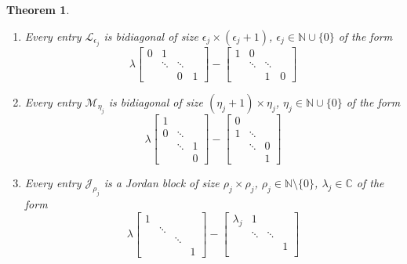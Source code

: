 \documentclass[]{book}
\providecommand{\tightlist}{%
  \setlength{\itemsep}{0pt}\setlength{\parskip}{0pt}}
\newtheorem{theorem}{Theorem}[chapter]
\theoremstyle{definition}
\theoremstyle{definition}
\theoremstyle{definition}
\theoremstyle{definition}
\theoremstyle{remark}
\begin{document}
\begin{theorem}
\begin{enumerate}
\def\labelenumi{\arabic{enumi}.}
\tightlist
\item
  Every entry \(\mathcal L_{\epsilon_j}\) is bidiagonal of size \(\epsilon_j\times (\epsilon_j +1)\), \(\epsilon_j \in \mathbb N \cup \{0\}\) of the form
  \begin{equation*}
  \lambda 
  \begin{bmatrix}
  0 & 1  \\
  & \ddots & \ddots \\
  && 0 & 1
  \end{bmatrix}
  -
  \begin{bmatrix}
  1 & 0  \\
  & \ddots & \ddots \\
  && 1 & 0
  \end{bmatrix}
  \end{equation*}
\item
  Every entry \(\mathcal M_{\eta_j}\) is bidiagonal of size \((\eta_j+1)\times \eta_j\), \(\eta_j \in \mathbb N \cup \{0\}\) of the form
  \begin{equation*}
  \lambda 
  \begin{bmatrix}
  1  \\
  0 & \ddots \\
  & \ddots & 1 \\
  && 0 
  \end{bmatrix}
  -
  \begin{bmatrix}
  0  \\
  1 & \ddots \\
  & \ddots & 0 \\
  && 1 
  \end{bmatrix}
  \end{equation*}
\item
  Every entry \(\mathcal J_{\rho_j}\) is a Jordan block of size \(\rho_j\times \rho_j\), \(\rho_j \in \mathbb N \setminus \{0\}\), \(\lambda_j \in \mathbb C\) of the form
  \begin{equation*}
  \lambda 
  \begin{bmatrix}
  1  \\
  & \ddots \\
  &&\ddots  \\
  &&& 1 
  \end{bmatrix}
  -
  \begin{bmatrix}
  \lambda_j & 1 \\
  & \ddots & \ddots \\
  &&& 1 \\

\end{bmatrix}
\end{equation*}
\end{enumerate}
\end{theorem}
\end{document}
